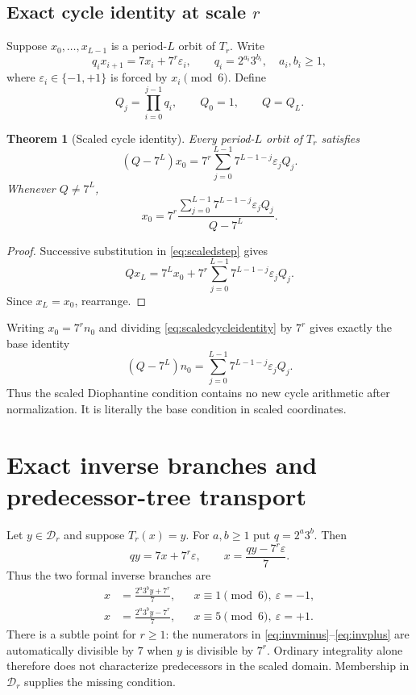 \documentclass[11pt]{article}
\newtheorem{theorem}{Theorem}[section]
\newcommand{\eps}{\varepsilon}
\begin{document}
\subsection{Exact cycle identity at scale $r$}
Suppose $x_0,\ldots,x_{L-1}$ is a period-$L$ orbit of $T_r$. Write
\begin{equation}
q_ix_{i+1}=7x_i+7^r\eps_i,
\qquad
q_i=2^{a_i}3^{b_i},\quad a_i,b_i\ge1,
\label{eq:scaledstep}
\end{equation}
where $\eps_i\in\{-1,+1\}$ is forced by $x_i\pmod6$. Define
\[
Q_j=\prod_{i=0}^{j-1}q_i,\qquad Q_0=1,\qquad Q=Q_L.
\]

\begin{theorem}[Scaled cycle identity]
Every period-$L$ orbit of $T_r$ satisfies
\begin{equation}
(Q-7^L)x_0
=7^r\sum_{j=0}^{L-1}7^{L-1-j}\eps_jQ_j.
\label{eq:scaledcycleidentity}
\end{equation}
Whenever $Q\ne7^L$,
\begin{equation}
x_0=7^r\frac{\sum_{j=0}^{L-1}7^{L-1-j}\eps_jQ_j}{Q-7^L}.
\label{eq:scaledcyclex0}
\end{equation}
\end{theorem}
\begin{proof}
Successive substitution in \eqref{eq:scaledstep} gives
\[
Qx_L=7^Lx_0+7^r\sum_{j=0}^{L-1}7^{L-1-j}\eps_jQ_j.
\]
Since $x_L=x_0$, rearrange.
\end{proof}

Writing $x_0=7^rn_0$ and dividing \eqref{eq:scaledcycleidentity} by $7^r$ gives exactly the base identity
\begin{equation}
(Q-7^L)n_0=\sum_{j=0}^{L-1}7^{L-1-j}\eps_jQ_j.
\label{eq:basecycleidentityagain}
\end{equation}
Thus the scaled Diophantine condition contains no new cycle arithmetic after normalization. It is literally the base condition in scaled coordinates.

\section{Exact inverse branches and predecessor-tree transport}
Let $y\in\mathcal D_r$ and suppose $T_r(x)=y$. For $a,b\ge1$ put $q=2^a3^b$. Then
\begin{equation}
qy=7x+7^r\eps,
\qquad
x=\frac{qy-7^r\eps}{7}.
\label{eq:scaledinversegeneral}
\end{equation}
Thus the two formal inverse branches are
\begin{align}
x&=\frac{2^a3^b y+7^r}{7},&&x\equiv1\pmod6,\ \eps=-1,
\label{eq:invminus}\\
x&=\frac{2^a3^b y-7^r}{7},&&x\equiv5\pmod6,\ \eps=+1.
\label{eq:invplus}
\end{align}
There is a subtle point for $r\ge1$: the numerators in \eqref{eq:invminus}--\eqref{eq:invplus} are automatically divisible by $7$ when $y$ is divisible by $7^r$. Ordinary integrality alone therefore does not characterize predecessors in the scaled domain. Membership in $\mathcal D_r$ supplies the missing condition.
\end{document}

